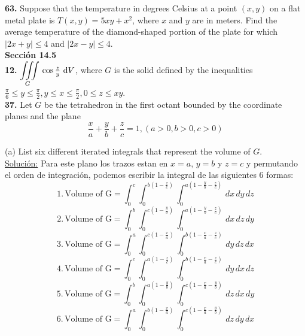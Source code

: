 \documentclass[11pt]{report}
\newcommand{\s}{\underline{Soluci\'{o}n:}}
\begin{document}
\textbf{63.} Suppose that the temperature in degrees Celsius at a point $(x, y)$
on a flat metal plate is $T(x, y) = 5xy + x^2 $, where $x$ and $y$ are in meters.
Find the average temperature of the diamond-shaped portion of the plate for which
$|2x + y| \leq 4$ and $|2x - y| \leq 4$. \\

\textbf{Sección 14.5} \\

\textbf{12.} $ {\displaystyle \iiint \limits_G } \, \cos{\frac{z}{y}} \, \, \text dV $,
where $G$ is the solid defined by the inequalities
$\frac{\pi}{6} \leq y \leq \frac{\pi}{2}, y \leq x \leq \frac{\pi}{2}, 0 \leq z \leq xy$. \\


\textbf{37.} Let $G$ be the tetrahedron in the first octant bounded by the
coordinate planes and the plane \\

\[ \frac{x}{a} + \frac{y}{b} + \frac{z}{c} = 1, (a > 0, b > 0, c > 0) \]

(a) List six different iterated integrals that represent the volume of $G$. \\
\s
Para este plano los trazos estan en $x = a$, $y = b$ y $z = c$ y permutando el
orden de integraci\'{o}n, podemos escribir la integral de las siguientes
6 formas:
$$1. \, \text{Volume of G} = \int^{c}_{0} \int^{b\left(1-\frac{z}{c}\right)}_{0}
                             \int^{a\left(1-\frac{y}{b}-\frac{z}{c}\right)}_{0}
                             \,dx \, dy \, dz$$
$$2. \, \text{Volume of G} = \int^{b}_{0} \int^{c\left(1-\frac{y}{b}\right)}_{0}
                             \int^{a\left(1-\frac{y}{b}-\frac{z}{c}\right)}_{0}
                             \, dx \, dz \, dy$$
$$3. \, \text{Volume of G} = \int^{a}_{0} \int^{c\left(1-\frac{x}{a}\right)}_{0}
                             \int^{b\left(1-\frac{x}{a}-\frac{z}{c}\right)}_{0}
                             \, dy \, dz \, dx$$
$$4. \, \text{Volume of G} = \int^{c}_{0} \int^{a\left(1-\frac{z}{c}\right)}_{0}
                             \int^{b\left(1-\frac{x}{a}-\frac{z}{c}\right)}_{0}
                             \, dy \, dx \, dz$$
$$5. \, \text{Volume of G} = \int^{b}_{0} \int^{a\left(1-\frac{y}{b}\right)}_{0}
                             \int^{c\left(1-\frac{x}{a}-\frac{y}{b}\right)}_{0}
                             \, dz \, dx \, dy$$
$$6. \, \text{Volume of G} = \int^{a}_{0} \int^{b\left(1-\frac{x}{a}\right)}_{0}
                             \int^{c\left(1-\frac{x}{a}-\frac{y}{b}\right)}_{0}
                             \, dz \, dy \, dx$$
\end{document}

